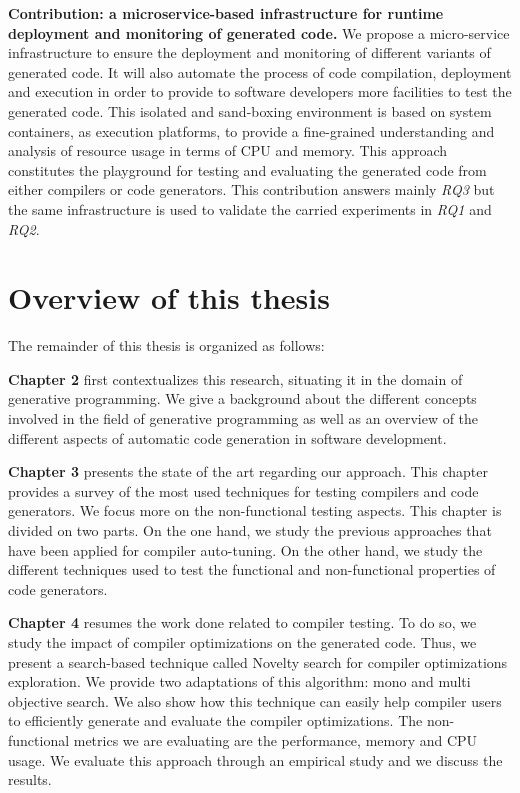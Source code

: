 \textbf{Contribution: a microservice-based infrastructure for runtime deployment and monitoring of generated code.}
We propose a micro-service infrastructure to ensure the deployment and monitoring of different variants of generated code. 
It will also automate the process of code compilation, deployment and execution in order to provide to software developers more facilities to test the generated code. 
This isolated and sand-boxing environment is based on system containers, as execution platforms, to provide a fine-grained understanding and analysis of resource usage in terms of CPU and memory. This approach constitutes the playground for testing and evaluating the generated code from either compilers or code generators. This contribution answers mainly \textit{RQ3} but the same infrastructure is used to validate the carried experiments in \textit{RQ1} and \textit{RQ2}.

\section{Overview of this thesis}
The remainder of this thesis is organized  as follows:

\textbf{Chapter 2} first contextualizes this research, situating it in the domain of generative programming. We give a background about the different concepts involved in the field of generative programming as well as an overview of the different aspects of automatic code generation in software development. 


\textbf{Chapter 3}  presents the state of the art regarding our approach. This chapter
provides a survey of the most used techniques for testing compilers and code generators. We focus more on the non-functional testing aspects.
This chapter is divided on two parts. On the one hand, we study the previous approaches that have been applied for compiler auto-tuning. On the other hand, we study the different techniques used to test the functional and non-functional properties of code generators. 

\textbf{Chapter 4} resumes the work done related to compiler testing. To do so, we study the impact of compiler optimizations on the generated code. Thus, we present a search-based technique called Novelty search for compiler optimizations exploration. We provide two adaptations of this algorithm: mono and multi objective search. We also show how this technique can easily help compiler users to efficiently generate and evaluate the compiler optimizations. The non-functional metrics we are evaluating are the performance, memory and CPU usage. We evaluate this approach through an empirical study and we discuss the results.

